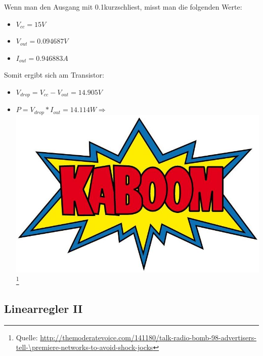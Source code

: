 Wenn man den Ausgang mit 0.1\Ohm kurzschliest, misst man die folgenden Werte:
\begin{itemize}
	\item $ V_{cc} = 15V $
	\item $ V_{out} = 0.094687V $
	\item $ I_{out} = 0.946883A $
\end{itemize}
Somit ergibt sich am Transistor:
\begin{itemize}
	\item $ V_{drop} = V_{cc} - V_{out} = 14.905V $
	\item $ P = V_{drop} * I_{out} = 14.114W \Rightarrow $ \includegraphics[height=1.5\baselineskip]{versuch7/kaboom.png}\footnote{Quelle: \url{http://themoderatevoice.com/141180/talk-radio-bomb-98-advertisers-tell-\premiere-networks-to-avoid-shock-jocks}}
\end{itemize}
\subsection{Linearregler II}
